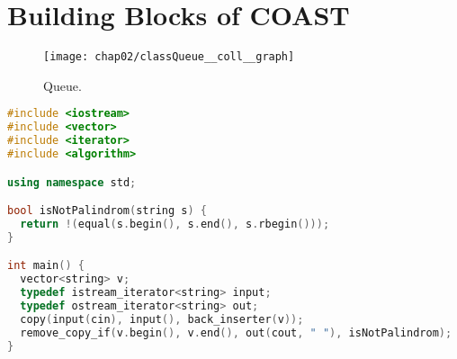 \chapter{Building Blocks of COAST}\label{BuildingBlocks}

\begin{figure}[hbt]
  \centering
  \texttt{[image: chap02/classQueue\_\_coll\_\_graph]}
  \caption{Queue.}
  \label{fig:queue}
\end{figure}

\begin{lstlisting}[language=C++, caption=Example Source]
#include <iostream>
#include <vector>
#include <iterator>
#include <algorithm>

using namespace std;

bool isNotPalindrom(string s) {
  return !(equal(s.begin(), s.end(), s.rbegin()));
}

int main() {
  vector<string> v;
  typedef istream_iterator<string> input;
  typedef ostream_iterator<string> out;
  copy(input(cin), input(), back_inserter(v));
  remove_copy_if(v.begin(), v.end(), out(cout, " "), isNotPalindrom);
}
\end{lstlisting}